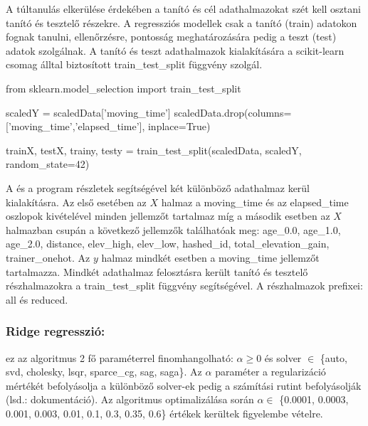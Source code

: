\begin{programreszlet} A túltanulás elkerülése érdekében a tanító és cél adathalmazokat szét kell osztani tanító és tesztelő részekre. A regressziós modellek csak a tanító (train) adatokon fognak tanulni, ellenőrzésre, pontosság meghatározására pedig a teszt (test) adatok szolgálnak. A tanító és teszt adathalmazok kialakítására a scikit-learn csomag álltal biztosított train\_test\_split függvény szolgál.
\begin{python}
from sklearn.model_selection import train_test_split
	
scaledY = scaledData['moving_time']
scaledData.drop(columns=['moving_time','elapsed_time'], inplace=True)

trainX, testX, trainy, testy = train_test_split(scaledData, scaledY, 
						random_state=42)
\end{python}
\label{prog:movingTrainTestSplit}
\end{programreszlet}

A  és a  program részletek segítségével két különböző adathalmaz kerül kialakításra. Az első esetében az $X$ halmaz a moving\_time és az elapsed\_time oszlopok kivételével minden jellemzőt tartalmaz míg a második esetben az $X$ halmazban csupán a következő jellemzők találhatóak meg:  age\_0.0, age\_1.0, age\_2.0, distance, elev\_high, elev\_low, hashed\_id, total\_elevation\_gain, trainer\_onehot. Az $y$ halmaz mindkét esetben a moving\_time jellemzőt tartalmazza. Mindkét adathalmaz felosztásra került tanító és tesztelő részhalmazokra a train\_test\_split függvény segítségével. A részhalmazok prefixei: all és reduced.

\subsubsection{Ridge regresszió:} ez az algoritmus 2 fő paraméterrel finomhangolható: $\alpha \geq 0 $ és solver $\in$ \{auto, svd, cholesky, lsqr, sparce\_cg, sag, saga\}. Az $\alpha$ paraméter a regularizáció mértékét befolyásolja a különböző solver-ek pedig a számítási rutint befolyásolják (lsd.: dokumentáció). Az algoritmus optimalizálása során $\alpha \in$ \{0.0001, 0.0003, 0.001, 0.003, 0.01, 0.1, 0.3, 0.35, 0.6\} értékek kerültek figyelembe vételre.


